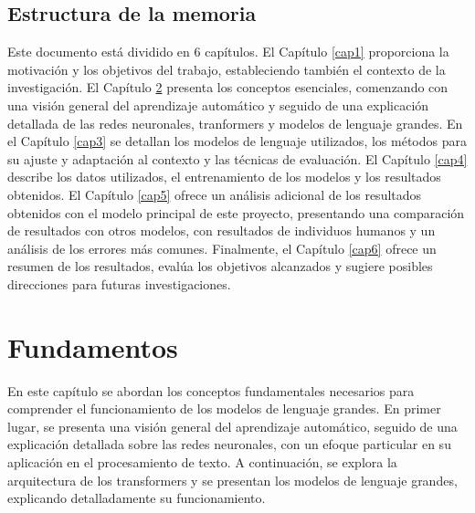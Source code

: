 \documentclass[11pt,spanish,listoffigures,listoftables]{tfgetsinf}
\begin{document}
\section{Estructura de la memoria}

Este documento está dividido en 6 capítulos. El Capítulo \ref{cap1} proporciona la motivación y los objetivos del trabajo, estableciendo también el contexto de la investigación. El Capítulo \ref{cap2} presenta los conceptos esenciales, comenzando con una visión general del aprendizaje automático y seguido de una explicación detallada de las redes neuronales, tranformers y modelos de lenguaje grandes. En el Capítulo \ref{cap3} se detallan los modelos de lenguaje utilizados, los métodos para su ajuste y adaptación al contexto y las técnicas de evaluación. El Capítulo \ref{cap4} describe los datos utilizados, el entrenamiento de los modelos y los resultados obtenidos. El Capítulo \ref{cap5} ofrece un análisis adicional de los resultados obtenidos con el modelo principal de este proyecto, presentando una comparación de resultados con otros modelos, con resultados de individuos humanos y un análisis de los errores más comunes. Finalmente, el Capítulo \ref{cap6} ofrece un resumen de los resultados, evalúa los objetivos alcanzados y sugiere posibles direcciones para futuras investigaciones.




\chapter{Fundamentos}\label{cap2}

En este capítulo se abordan los conceptos fundamentales necesarios para comprender el funcionamiento de los modelos de lenguaje grandes. En primer lugar, se presenta una visión general del aprendizaje automático, seguido de una explicación detallada sobre las redes neuronales, con un efoque particular en su aplicación en el procesamiento de texto. A continuación, se explora la arquitectura de los transformers y se presentan los modelos de lenguaje grandes, explicando detalladamente su funcionamiento.
\end{document}
